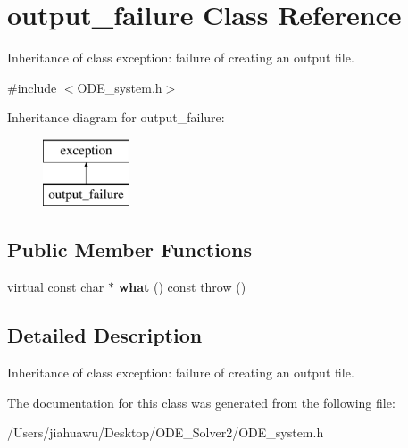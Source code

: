 \hypertarget{classoutput__failure}{}\section{output\+\_\+failure Class Reference}
\label{classoutput__failure}


Inheritance of class exception\+: failure of creating an output file.  




{\ttfamily \#include $<$O\+D\+E\+\_\+system.\+h$>$}

Inheritance diagram for output\+\_\+failure\+:\begin{figure}[H]
\begin{center}
\leavevmode
\includegraphics[height=2.000000cm]{classoutput__failure}
\end{center}
\end{figure}
\subsection*{Public Member Functions}
\begin{DoxyCompactItemize}
\item 
\mbox{\label{classoutput__failure_a8a4cdc4871b3eaec0f4d2d49676f295a}} 
virtual const char $\ast$ {\bfseries what} () const  throw ()
\end{DoxyCompactItemize}


\subsection{Detailed Description}
Inheritance of class exception\+: failure of creating an output file. 

The documentation for this class was generated from the following file\+:\begin{DoxyCompactItemize}
\item 
/\+Users/jiahuawu/\+Desktop/\+O\+D\+E\+\_\+\+Solver2/O\+D\+E\+\_\+system.\+h\end{DoxyCompactItemize}
